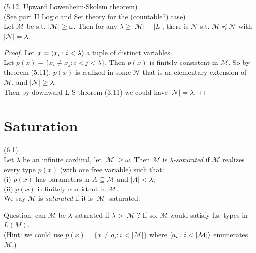 \documentclass[a4paper]{article}
\begin{document}
\begin{thm} (5.12, Upward L$\ddot{o}$wenheim-Skolem theorem)\\
    (See part II Logic and Set theory for the (countable?) case)\\
    Let $\mathcal{M}$ be s.t. $|\mathcal{M}| \geq \omega$. Then for any $\lambda \geq |\mathcal{M}| + |L|$, there is $\mathcal{N}$ s.t. $\mathcal{M} \preccurlyeq \mathcal{N}$ with $|\mathcal{N}| = \lambda$.
    \begin{proof}
        Let $\bar{x} = \langle x_i: i < \lambda \rangle$ a tuple of distinct variables.\\
        Let $p(\bar{x}) = \{x_i \neq x_j: i < j < \lambda\}$. Then $p(\bar{x})$ is finitely consistent in $\mathcal{M}$. So by theorem (5.11), $p(\bar{x})$ is realized in some $\mathcal{N}$ that is an elementary extension of $\mathcal{M}$, and $|\mathcal{N}| \geq \lambda$.\\
        Then by downward L-S theorem (3.11) we could have $|\mathcal{N}| = \lambda$.
    \end{proof}
\end{thm}

\newpage

\section{Saturation}

\begin{defi} (6.1)\\
    Let $\lambda$ be an infinite cardinal, let $|\mathcal{M}| \geq \omega$. Then $\mathcal{M}$ is \emph{$\lambda$-saturated} if $\mathcal{M}$ realizes every type $p(x)$ (with one free variable) such that:\\
    (i) $p(x)$ has parameters in $A \subseteq \mathcal{M}$ and $|A| < \lambda$;\\
    (ii) $p(x)$ is finitely consistent in $\mathcal{M}$.\\
    We say $\mathcal{M}$ is \emph{saturated} if it is $|\mathcal{M}|$-saturated.
\end{defi}

Question: can $\mathcal{M}$ be $\lambda$-saturated if $\lambda > |\mathcal{M}|$? If so, $\mathcal{M}$ would satisfy f.s. types in $L(M)$.\\
(Hint: we could use $p(x) = \{x \neq a_i: i < |\mathcal{M}|\}$ where $\bra a_i: i<|\mathcal{M}| \ket$ enumerates $\mathcal{M}$.)
\end{document}

